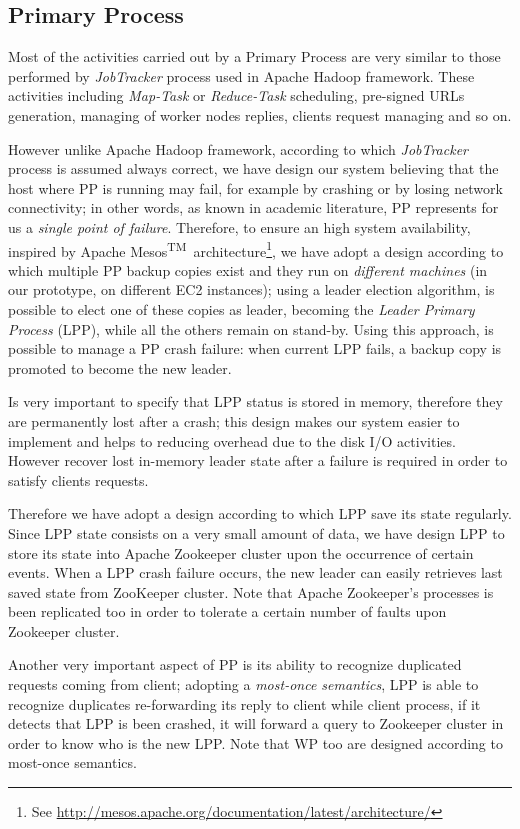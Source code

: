 \documentclass[sigchi]{acmart}
\begin{document}
\subsection{Primary Process}

Most of the activities carried out by a Primary Process are very similar to those performed by \textit{JobTracker} process used in Apache Hadoop framework. These activities including \textit{Map-Task} or \textit{Reduce-Task} scheduling, pre-signed URLs generation, managing of worker nodes replies, clients request managing and so on.

However unlike Apache Hadoop framework, according to which \textit{JobTracker} process is assumed always correct, we have design our system believing that the host where PP is running may fail, for example by crashing or by losing network connectivity; in other words, as known in academic literature, PP represents for us a \textit{single point of failure}. Therefore, to ensure an high system availability, inspired by Apache Mesos\textsuperscript{TM}\ architecture\footnote{See \url{http://mesos.apache.org/documentation/latest/architecture/}}, we have adopt a design according to which multiple PP backup copies exist and they run on \textit{different machines} (in our prototype, on different EC2 instances); using a leader election algorithm, is possible to elect one of these copies as leader, becoming the \textit{Leader Primary Process} (LPP), while all the others remain on stand-by. Using this approach, is possible to manage a PP crash failure: when current LPP fails, a backup copy is promoted to become the new leader. 

Is very important to specify that LPP status is stored in memory, therefore they are permanently lost after a crash; this design makes our system easier to implement and helps to reducing overhead due to the disk I/O activities. However recover lost in-memory leader state after a failure is required in order to satisfy clients requests. 

Therefore we have adopt a design according to which LPP save its state regularly. Since LPP state consists on a very small amount of data, we have design LPP to store its state into Apache Zookeeper cluster upon the occurrence of certain events. When a LPP crash failure occurs, the new leader can easily retrieves last saved state from  ZooKeeper cluster. Note that Apache Zookeeper's processes is been replicated too in order to tolerate a certain number of faults upon Zookeeper cluster.

Another very important aspect of PP is its ability to recognize duplicated requests coming from client; adopting a \textit{most-once semantics}, LPP is able to recognize duplicates re-forwarding its reply to client while client process, if it detects that LPP is been crashed, it will forward a query to Zookeeper cluster in order to know who is the new LPP. Note that WP too are designed according to most-once semantics.
\end{document}

